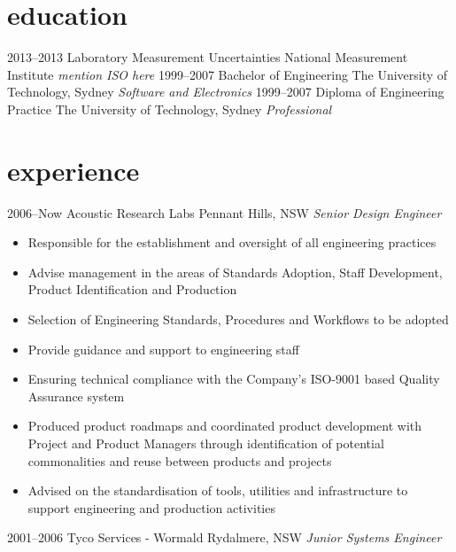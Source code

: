 \documentclass[]{friggeri-cv} %
\begin{document}
\section{education}
\begin{entrylist}
    \entry
    {2013--2013}
    {Laboratory {\normalfont{} Measurement Uncertainties}}
    {National Measurement Institute}
    {\emph{mention ISO here}}
    \entry
    {1999--2007}
    {Bachelor {\normalfont{} of Engineering}}
    {The University of Technology, Sydney}
    {\emph{Software and Electronics}}
    \entry
    {1999--2007}
    {Diploma {\normalfont{} of Engineering Practice}}
    {The University of Technology, Sydney}
    {\emph{Professional}}
\end{entrylist}

\section{experience}
\begin{entrylist}
    \entry
    {2006--Now}
    {Acoustic Research Labs}
    {Pennant Hills, NSW}
    {\emph{Senior Design Engineer}}
\end{entrylist}

\begin{itemize}
    \item Responsible for the establishment and oversight of all engineering practices
    \item Advise management in the areas of Standards Adoption, Staff Development, Product Identification and Production
    \item Selection of Engineering Standards, Procedures and Workflows to be adopted
    \item Provide guidance and support to engineering staff
    \item Ensuring technical compliance with the Company’s ISO-9001 based Quality Assurance system
    \item Produced product roadmaps and coordinated product development with Project and Product Managers through identification of potential commonalities and reuse between products and projects
    \item Advised on the standardisation of tools, utilities and infrastructure to support engineering and production activities
\end{itemize}

\begin{entrylist}
    \entry
    {2001--2006}
    {Tyco Services - Wormald}
    {Rydalmere, NSW}
    {\emph{Junior Systems Engineer}}
\end{entrylist}
\end{document}
